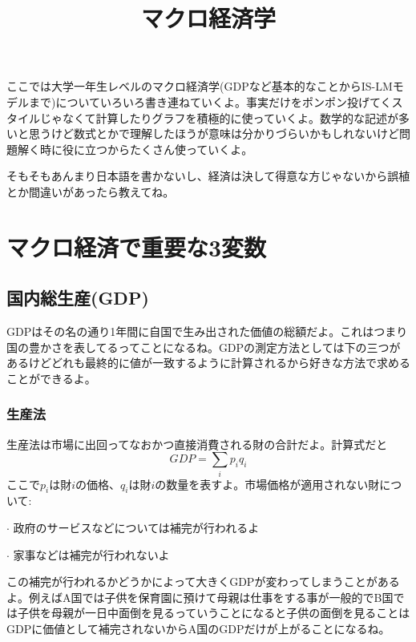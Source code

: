 \documentclass[dvipdfmx,a4paper, 12pt]{article}
\begin{document}
\setlength{\abovedisplayskip}{1pt}
\setlength{\belowdisplayskip}{1pt}

\onehalfspacing

\title{マクロ経済学}
\author{}
\date{}
\maketitle

\newpage

\tableofcontents

\newpage

\begin{Introduction}
ここでは大学一年生レベルのマクロ経済学(GDPなど基本的なことからIS-LMモデルまで)についていろいろ書き連ねていくよ。事実だけをポンポン投げてくスタイルじゃなくて計算したりグラフを積極的に使っていくよ。数学的な記述が多いと思うけど数式とかで理解したほうが意味は分かりづらいかもしれないけど問題解く時に役に立つからたくさん使っていくよ。

そもそもあんまり日本語を書かないし、経済は決して得意な方じゃないから誤植とか間違いがあったら教えてね。

\newpage

\section{マクロ経済で重要な3変数}
\subsection{国内総生産(GDP)}
GDPはその名の通り1年間に自国で生み出された価値の総額だよ。これはつまり国の豊かさを表してるってことになるね。GDPの測定方法としては下の三つがあるけどどれも最終的に値が一致するように計算されるから好きな方法で求めることができるよ。
\subsubsection{生産法}
生産法は市場に出回ってなおかつ直接消費される財の合計だよ。計算式だと
\begin{equation*}
    GDP=\sum_i p_iq_i
\end{equation*}
ここで$p_i$は財$i$の価格、$q_i$は財$i$の数量を表すよ。市場価格が適用されない財について:

\quad $\cdot$ 政府のサービスなどについては補完が行われるよ

\quad $\cdot$ 家事などは補完が行われないよ

この補完が行われるかどうかによって大きくGDPが変わってしまうことがあるよ。例えばA国では子供を保育園に預けて母親は仕事をする事が一般的でB国では子供を母親が一日中面倒を見るっていうことになると子供の面倒を見ることはGDPに価値として補完されないからA国のGDPだけが上がることになるね。


\end{Introduction}
\end{document}
